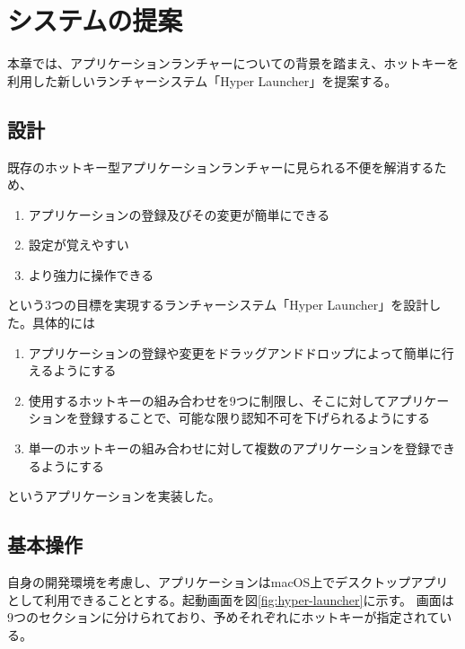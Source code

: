 \chapter{システムの提案}
\label{chap:system}
本章では、アプリケーションランチャーについての背景を踏まえ、ホットキーを利用した新しいランチャーシステム「Hyper Launcher」を提案する。

\newpage

\section{設計}
既存のホットキー型アプリケーションランチャーに見られる不便を解消するため、

\begin{enumerate}
	\item アプリケーションの登録及びその変更が簡単にできる
	\item 設定が覚えやすい
	\item より強力に操作できる
\end{enumerate}

という3つの目標を実現するランチャーシステム「Hyper Launcher」を設計した。具体的には

\begin{enumerate}
	\item アプリケーションの登録や変更をドラッグアンドドロップによって簡単に行えるようにする
	\item 使用するホットキーの組み合わせを9つに制限し、そこに対してアプリケーションを登録することで、可能な限り認知不可を下げられるようにする
	\item 単一のホットキーの組み合わせに対して複数のアプリケーションを登録できるようにする
\end{enumerate}

というアプリケーションを実装した。

\section{基本操作}
自身の開発環境を考慮し、アプリケーションはmacOS上でデスクトップアプリとして利用できることとする。起動画面を図\ref{fig:hyper-launcher}に示す。
画面は9つのセクションに分けられており、予めそれぞれにホットキーが指定されている。

